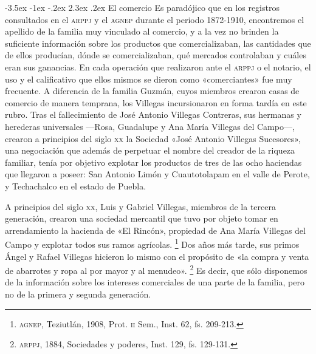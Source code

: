 \documentclass[14pt,twoside,final]{extbook} %
\makeatletter
\let\oldfootnote\footnote
\renewcommand\footnote[1]{%
\oldfootnote{\hspace{1mm}#1}}
\renewcommand\section{\@startsection {section}{1}{\z@}%
                                     {-3.5ex \@plus -1ex \@minus -.2ex}%
                                     {2.3ex \@plus .2ex}%
                                     {\normalfont\large\bfseries\sc}}
\makeatother
\begin{document}
\section{El comercio}
\label{sec:el-comercio}
Es paradójico que en los registros consultados en el \textsc{arppj} y el \textsc{agnep} durante el
periodo 1872-1910, encontremos el apellido de la familia muy vinculado al comercio, y a la vez no brinden la suficiente información sobre los productos que comercializaban, las cantidades que de ellos producían, dónde se comercializaban, qué mercados controlaban y cuáles eran sus ganancias. En cada operación que realizaron ante el \textsc{arppj} o el notario, el uso y el calificativo que ellos mismos se dieron como «comerciantes» fue muy frecuente. A diferencia de la familia Guzmán, cuyos miembros crearon casas de comercio de manera temprana, los Villegas incursionaron en forma tardía en este rubro. Tras el fallecimiento de José Antonio Villegas Contreras, sus hermanas y herederas universales ---Rosa, Guadalupe y Ana María Villegas del Campo---, crearon a principios del siglo \textsc{xx} la Sociedad «José Antonio Villegas Sucesores», una negociación que además de perpetuar el nombre del creador de la riqueza familiar, tenía por objetivo explotar los productos de tres de las ocho haciendas que llegaron a poseer: San Antonio Limón y Cuautotolapam en el valle de Perote, y Techachalco en el estado de Puebla.

A principios del siglo \textsc{xx}, Luis y Gabriel Villegas, miembros de la tercera generación, crearon una sociedad mercantil que tuvo por objeto tomar en arrendamiento la hacienda de «El Rincón», propiedad de Ana María Villegas del Campo y explotar todos sus ramos agrícolas.\footnote{\textsc{agnep}, Teziutlán, 1908, Prot. \textsc{ii} Sem., Inst. 62, fs. 209-213.} Dos años más tarde, sus primos Ángel y Rafael Villegas hicieron lo mismo con el propósito de «la compra y venta de abarrotes y ropa al por mayor y al menudeo».\footnote{\textsc{arppj}, 1884, Sociedades y poderes, Inst. 129, fs. 129-131.} Es decir, que sólo disponemos de la información sobre los intereses comerciales de una parte de la familia, pero no de la primera y segunda generación.
\end{document}

